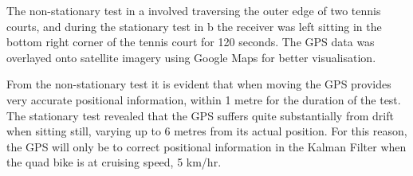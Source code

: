 \documentclass[main.tex]{subfiles}
\begin{document}
The non-stationary test in a involved traversing the outer edge of two tennis courts, and during the stationary test in b the receiver was left sitting in the bottom right corner of the tennis court for 120 seconds. The GPS data was overlayed onto satellite imagery using Google Maps for better visualisation.

From the non-stationary test it is evident that when moving the GPS provides very accurate positional information, within 1 metre for the duration of the test. The stationary test revealed that the GPS suffers quite substantially from drift when sitting still, varying up to 6 metres from its actual position. For this reason, the GPS will only be to correct positional information in the Kalman Filter when the quad bike is at cruising speed, 5 km/hr.
\end{document}
